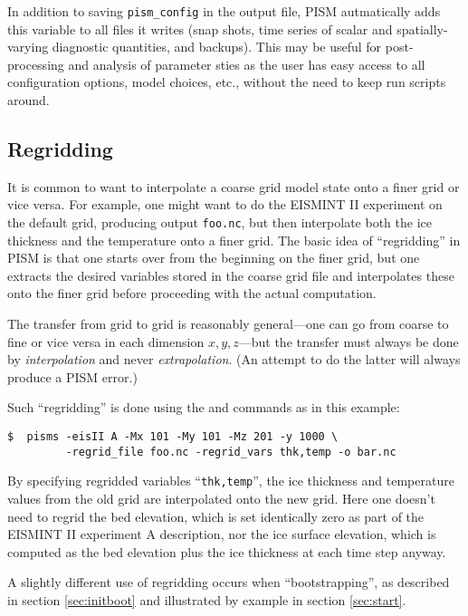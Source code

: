 In addition to saving \texttt{pism_config} in the output file, PISM autmatically adds this  variable to all files it writes (snap shots, time series of scalar and spatially-varying diagnostic quantities, and backups). This may be useful for post-processing and analysis of parameter sties as the user has easy access to all configuration options, model choices, etc., without the need to keep run scripts around.

\subsection{Regridding}
\label{sec:regridding}

It is common to want to interpolate a coarse grid model state onto a finer grid or vice versa.  For example, one might want to do the EISMINT II experiment on the default grid, producing output \texttt{foo.nc}, but then interpolate both the ice thickness and the temperature onto a finer grid.  The basic idea of ``regridding'' in PISM is that one starts over from the beginning on the finer grid, but one extracts the desired variables stored in the coarse grid file and interpolates these onto the finer grid before proceeding with the actual computation.

The transfer from grid to grid is reasonably general---one can go from coarse to fine or vice versa in each dimension $x,y,z$---but the transfer must always be done by \emph{interpolation} and never \emph{extrapolation}.  (An attempt to do the latter will always produce a PISM error.)

Such ``regridding'' is done using the  and
 commands as in this example: 

\begin{verbatim}
$  pisms -eisII A -Mx 101 -My 101 -Mz 201 -y 1000 \
         -regrid_file foo.nc -regrid_vars thk,temp -o bar.nc
\end{verbatim}
\noindent By specifying regridded variables ``\texttt{thk,temp}'', the ice thickness and temperature values from the old grid are interpolated onto the new grid.  Here one doesn't need to regrid the bed elevation, which is set identically zero as part of the EISMINT II experiment A description, nor the ice surface elevation, which is computed as the bed elevation plus the ice thickness at each time step anyway.

A slightly different use of regridding occurs when ``bootstrapping'', as described in section \ref{sec:initboot} and illustrated by example in section \ref{sec:start}.


